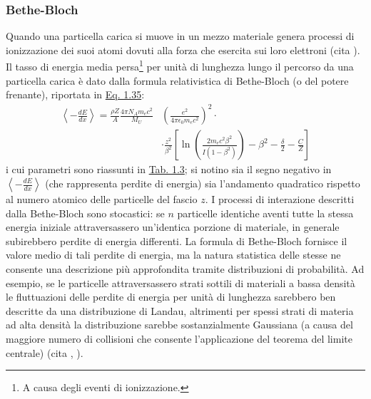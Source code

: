 \documentclass[12pt,a4paper,twoside]{report}
\begin{document}
	\subsubsection{Bethe-Bloch}\label{par:bethe_bloch}
	Quando una particella carica si muove in un mezzo materiale genera processi di ionizzazione dei suoi atomi dovuti alla forza che esercita sui loro elettroni (cita
	). Il tasso di energia media persa\footnote{A causa degli eventi di ionizzazione.} per unità di lunghezza lungo il percorso da una particella carica è dato dalla formula relativistica di Bethe-Bloch (o del potere frenante), riportata in \hyperref[eq:bethe_bloch]{Eq. 1.35}:
	\begin{equation}
		\begin{split}
			\left\langle-\frac{dE}{dx} \right\rangle=\frac{\rho Z}{A}\frac{4\pi N_Am_ec^2}{M_U}&\left(\frac{e^2}{4\pi\epsilon_0m_ec^2}\right)^2\cdot\\
			&\cdot\frac{z^2}{\beta^2}\left[\ln{\left(\frac{2m_ec^2\beta^2}{I\left(1-\beta^2\right)}\right)}-\beta^2-\frac{\delta}{2}-\frac{C}{Z}\right]
		\end{split}
		\label{eq:bethe_bloch}
	\end{equation}
	i cui parametri sono riassunti in \hyperref[tab:bethe_bloch]{Tab. 1.3}; si notino sia il segno negativo in $\left\langle-\frac{dE}{dx} \right\rangle$ (che rappresenta perdite di energia) sia l'andamento quadratico rispetto al numero atomico delle particelle del fascio $z$. I processi di interazione descritti dalla Bethe-Bloch sono stocastici: se $n$ particelle identiche aventi tutte la stessa energia iniziale attraversassero un'identica porzione di materiale, in generale subirebbero perdite di energia differenti. La formula di Bethe-Bloch fornisce il valore medio di tali perdite di energia, ma la natura statistica delle stesse ne consente una descrizione più approfondita tramite distribuzioni di probabilità. Ad esempio, se le particelle attraversassero strati sottili di materiali a bassa densità le fluttuazioni delle perdite di energia per unità di lunghezza sarebbero ben descritte da una distribuzione di Landau, altrimenti per spessi strati di materia ad alta densità la distribuzione sarebbe sostanzialmente Gaussiana (a causa del maggiore numero di collisioni che consente l'applicazione del teorema del limite centrale) (cita
	,
	).
	
\end{document}
